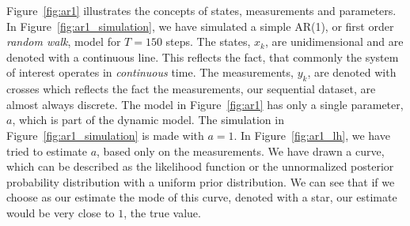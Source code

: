Figure~\ref{fig:ar1} illustrates the concepts of states, measurements and parameters. In
Figure~\ref{fig:ar1_simulation}, we have simulated a simple AR(1), or first order \emph{random walk},
model for $T=150$ steps. The states, $x_k$, are unidimensional and are denoted with a continuous
line. This reflects the fact, that commonly the system of interest operates in \emph{continuous}
time. The measurements, $y_k$, are denoted with crosses which reflects the fact the 
measurements, our sequential dataset, are almost always discrete. The model in Figure~\ref{fig:ar1}
has only a single parameter, $a$, which is part of the dynamic model. The simulation
in Figure~\ref{fig:ar1_simulation} is made with $a=1$. In Figure~\ref{fig:ar1_lh}, we have
tried to estimate $a$, based only on the measurements. We have drawn a curve, which
can be described as the likelihood function or the unnormalized posterior probability distribution
with a uniform prior distribution. We can see that if we choose as our estimate the mode 
of this curve, denoted with a star, our estimate would be very close to $1$, the true value. 
%
% 
